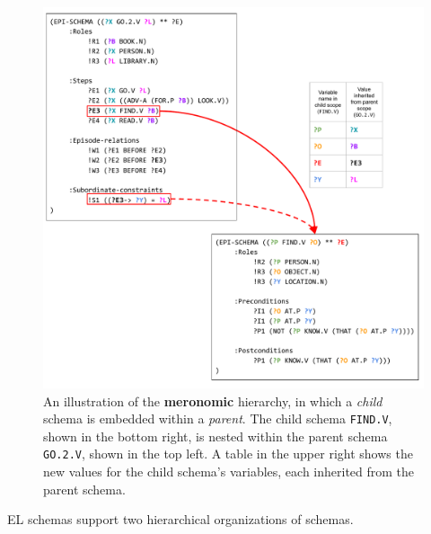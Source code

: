 \begin{figure}
    \centering
    \includegraphics[width=\columnwidth]{CH3_schemas/nesting}
    \caption{An illustration of the \textbf{meronomic} hierarchy, in which a \textit{child} schema is embedded within a \textit{parent}. The child schema \texttt{FIND.V}, shown in the bottom right, is nested within the parent schema \texttt{GO.2.V}, shown in the top left. A table in the upper right shows the new values for the child schema's variables, each inherited from the parent schema.}
    \label{fig:compo_hier}
\end{figure}

EL schemas support two hierarchical organizations of schemas.

